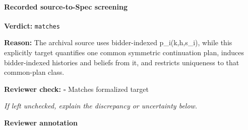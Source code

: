\documentclass[10pt]{article}
\newcommand{\reviewerbox}{%
  \par\noindent\fbox{\parbox{0.96\linewidth}{\rule{0pt}{0.38in}}}\par
}
\newcommand{\reviewmatch}[1]{%
  \par\noindent\textbf{Reviewer check:} $\square$\; #1\par
  \noindent\emph{If left unchecked, explain the discrepancy or uncertainty below.}\par
}
\begin{document}
\paragraph{Recorded source-to-Spec screening}
\textbf{Verdict:} \texttt{matches}
\\
{\raggedright
\textbf{Reason:} The archival source uses bidder-\allowbreak{}indexed p\_\allowbreak{}i(k,h,s\_\allowbreak{}i), while this explicitly target quantifies one common symmetric continuation plan, induces bidder-\allowbreak{}indexed histories and beliefs from it, and restricts uniqueness to that common-\allowbreak{}plan class.\allowbreak{}
\par}
\reviewmatch{Matches formalized target}
\noindent\textbf{Reviewer annotation}\par
\reviewerbox
\end{document}
